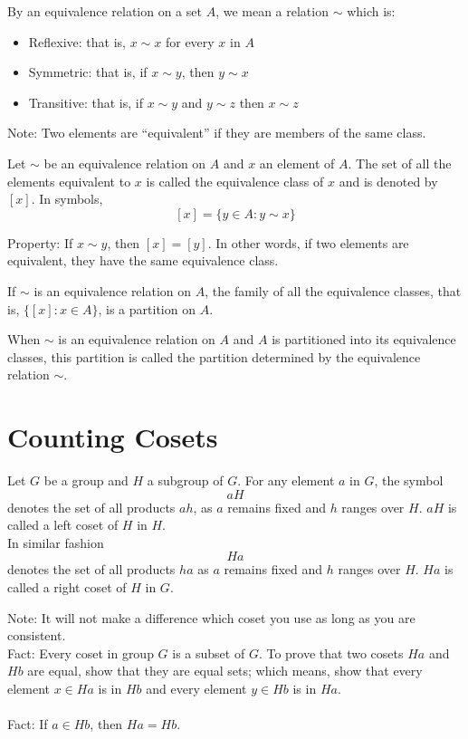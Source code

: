 \documentclass[12pt]{article}
\newcommand{\set}[1]{\{ #1 \}}
\begin{document}
By an equivalence relation on a set $A$, we mean a relation $\sim$ which is: \begin{itemize} 
\item Reflexive: that is, $x \sim x$ for every $x$ in $A$ 
\item Symmetric: that is, if $x \sim y$, then $y \sim x$
\item Transitive: that is, if $x \sim y$ and $y\sim z$ then $x \sim z$ \end{itemize} 

Note: Two elements are ``equivalent'' if they are members of the same class. 

\begin{definition} Let $\sim$ be an equivalence relation on $A$ and $x$ an element of $A$. The set of all the elements equivalent to $x$ is called the equivalence class of $x$ and is denoted by $[x]$. In symbols, 
$$[x] = \set{y \in A: y \sim x}$$ \end{definition} 

Property: If $x \sim y$, then $[x] = [y]$. In other words, if two elements are equivalent, they have the same equivalence class. 

\begin{theorem} If $\sim$ is an equivalence relation on $A$, the family of all the equivalence classes, that is, $\set{[x]: x \in A}$, is a partition on $A$. \end{theorem} 

When $\sim$ is an equivalence relation on $A$ and $A$ is partitioned into its equivalence classes, this partition is called the partition determined by the equivalence relation $\sim$. 


\section{Counting Cosets}

\begin{definition} Let $G$ be a group and $H$ a subgroup of $G$. For any element $a$ in $G$, the symbol $$aH$$ denotes the set of all products $ah$, as $a$ remains fixed and $h$ ranges over $H$. $aH$ is called a left coset of $H$ in $H$. \\ In similar fashion $$Ha$$ denotes the set of all products $ha$ as $a$ remains fixed and $h$ ranges over $H$. $Ha$ is called a right coset of $H$ in $G$. \end{definition} 

Note: It will not make a difference which coset you use as long as you are consistent. \\
Fact: Every coset in group $G$ is a subset of $G$. To prove that two cosets $Ha$ and $Hb$ are equal, show that they are equal sets; which means, show that every element $x \in Ha$ is in $Hb$ and every element $y \in Hb$ is in $Ha$. \\~\\
Fact: If $a \in Hb$, then $Ha = Hb$. 
\end{document}
